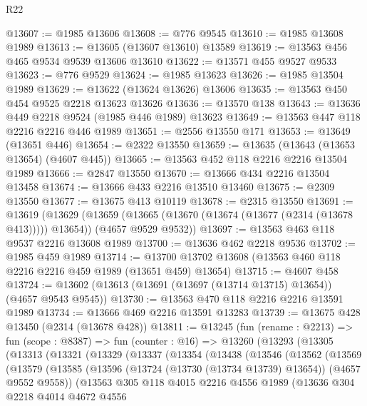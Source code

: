 \begin{lexlean}{R22}
\begin{coremodule}
@13607 := @1985 @13606
@13608 := @776 @9545
@13610 := @1985 @13608 @1989
@13613 := @13605 (@13607 @13610) @13589
@13619 := @13563 @456 @465 @9534 @9539 @13606 @13610
@13622 := @13571 @455 @9527 @9533
@13623 := @776 @9529
@13624 := @1985 @13623
@13626 := @1985 @13504 @1989
@13629 := @13622 (@13624 @13626) @13606
@13635 := @13563 @450 @454 @9525 @2218 @13623 @13626
@13636 := @13570 @138
@13643 := @13636 @449 @2218 @9524 (@1985 @446 @1989) @13623
@13649 := @13563 @447 @118 @2216 @2216 @446 @1989
@13651 := @2556 @13550 @171
@13653 := @13649 (@13651 @446)
@13654 := @2322 @13550
@13659 := @13635 (@13643 (@13653 @13654) (@4607 @445))
@13665 := @13563 @452 @118 @2216 @2216 @13504 @1989
@13666 := @2847 @13550
@13670 := @13666 @434 @2216 @13504 @13458
@13674 := @13666 @433 @2216 @13510 @13460
@13675 := @2309 @13550
@13677 := @13675 @413 @10119
@13678 := @2315 @13550
@13691 := @13619
    (@13629
      (@13659 (@13665 (@13670 (@13674 (@13677 (@2314 (@13678 @413))))) @13654))
      (@4657 @9529 @9532))
@13697 := @13563 @463 @118 @9537 @2216 @13608 @1989
@13700 := @13636 @462 @2218 @9536
@13702 := @1985 @459 @1989
@13714 := @13700 @13702 @13608 (@13563 @460 @118 @2216 @2216 @459 @1989 (@13651 @459) @13654)
@13715 := @4607 @458
@13724 := @13602 (@13613 (@13691 (@13697 (@13714 @13715) @13654)) (@4657 @9543 @9545))
@13730 := @13563 @470 @118 @2216 @2216 @13591 @1989
@13734 := @13666 @469 @2216 @13591 @13283
@13739 := @13675 @428 @13450 (@2314 (@13678 @428))
@13811 := @13245
    (fun (rename : @2213) =>
    fun (scope : @8387) =>
    fun (counter : @16) =>
    @13260
      (@13293
        (@13305
          (@13313
            (@13321
              (@13329
                (@13337
                  (@13354
                    (@13438
                      (@13546
                        (@13562
                          (@13569
                            (@13579
                              (@13585
                                (@13596
                                  (@13724 (@13730 (@13734 @13739) @13654))
                                  (@4657 @9552 @9558))
                                (@13563
                                  @305
                                  @118
                                  @4015
                                  @2216
                                  @4556
                                  @1989
                                  (@13636
                                    @304
                                    @2218
                                    @4014
                                    @4672
                                    @4556

\end{coremodule}
\end{lexlean}
